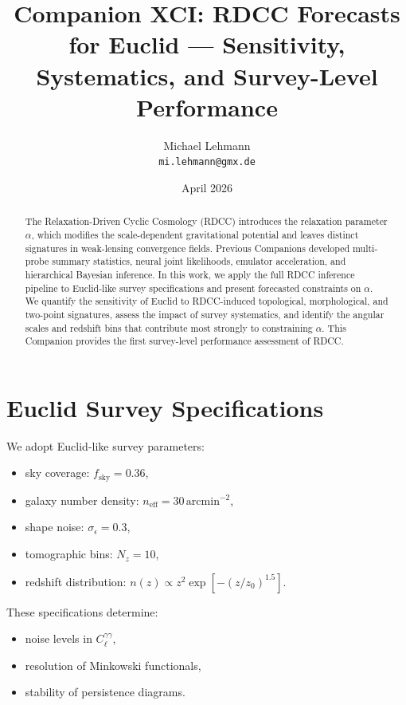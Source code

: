 \documentclass[11pt,a4paper]{article}
\title{\textbf{Companion XCI: RDCC Forecasts for Euclid — Sensitivity, Systematics, and Survey-Level Performance}}
\author{Michael Lehmann \\ \texttt{mi.lehmann@gmx.de}}
\date{April 2026}
\begin{document}
\maketitle

\begin{abstract}
The Relaxation-Driven Cyclic Cosmology (RDCC) introduces the relaxation parameter 
$\alpha$, which modifies the scale-dependent gravitational potential and leaves 
distinct signatures in weak-lensing convergence fields. Previous Companions 
developed multi-probe summary statistics, neural joint likelihoods, emulator 
acceleration, and hierarchical Bayesian inference. In this work, we apply the 
full RDCC inference pipeline to Euclid-like survey specifications and present 
forecasted constraints on $\alpha$. We quantify the sensitivity of Euclid to 
RDCC-induced topological, morphological, and two-point signatures, assess the 
impact of survey systematics, and identify the angular scales and redshift bins 
that contribute most strongly to constraining $\alpha$. This Companion provides 
the first survey-level performance assessment of RDCC.
\end{abstract}
\section{Euclid Survey Specifications}

We adopt Euclid-like survey parameters:

\begin{itemize}
    \item sky coverage: $f_{\mathrm{sky}} = 0.36$,
    \item galaxy number density: $n_{\mathrm{eff}} = 30\,\mathrm{arcmin}^{-2}$,
    \item shape noise: $\sigma_{\epsilon} = 0.3$,
    \item tomographic bins: $N_{z} = 10$,
    \item redshift distribution: $n(z) \propto z^{2} \exp[-(z/z_{0})^{1.5}]$.
\end{itemize}

These specifications determine:

\begin{itemize}
    \item noise levels in $C_{\ell}^{\gamma\gamma}$,
    \item resolution of Minkowski functionals,
    \item stability of persistence diagrams.
\end{itemize}
\end{document}
